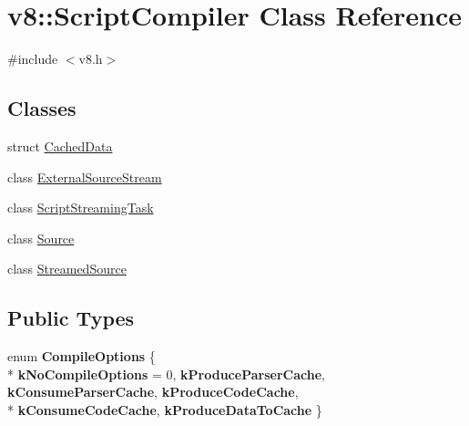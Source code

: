 \hypertarget{classv8_1_1_script_compiler}{}\section{v8\+:\+:Script\+Compiler Class Reference}
\label{classv8_1_1_script_compiler}


{\ttfamily \#include $<$v8.\+h$>$}

\subsection*{Classes}
\begin{DoxyCompactItemize}
\item 
struct \hyperlink{structv8_1_1_script_compiler_1_1_cached_data}{Cached\+Data}
\item 
class \hyperlink{classv8_1_1_script_compiler_1_1_external_source_stream}{External\+Source\+Stream}
\item 
class \hyperlink{classv8_1_1_script_compiler_1_1_script_streaming_task}{Script\+Streaming\+Task}
\item 
class \hyperlink{classv8_1_1_script_compiler_1_1_source}{Source}
\item 
class \hyperlink{classv8_1_1_script_compiler_1_1_streamed_source}{Streamed\+Source}
\end{DoxyCompactItemize}
\subsection*{Public Types}
\begin{DoxyCompactItemize}
\item 
\hypertarget{classv8_1_1_script_compiler_aa6db7774ab5d8793cd88db6b35a71818}{}enum {\bfseries Compile\+Options} \{ \\*
{\bfseries k\+No\+Compile\+Options} = 0, 
{\bfseries k\+Produce\+Parser\+Cache}, 
{\bfseries k\+Consume\+Parser\+Cache}, 
{\bfseries k\+Produce\+Code\+Cache}, 
\\*
{\bfseries k\+Consume\+Code\+Cache}, 
{\bfseries k\+Produce\+Data\+To\+Cache}
 \}\label{classv8_1_1_script_compiler_aa6db7774ab5d8793cd88db6b35a71818}

\end{DoxyCompactItemize}
